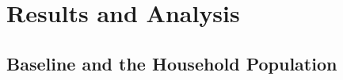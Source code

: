 \section{Results and Analysis}
\label{ch:results}

%
%
%
%
%

\subsection{Baseline and the Household Population}
\label{sec:results-baseline}

%

